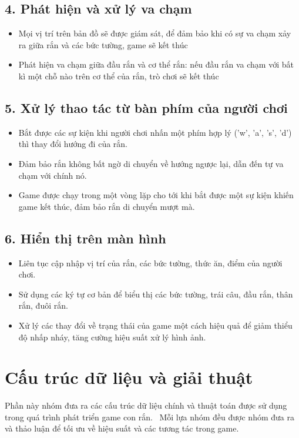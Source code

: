 \documentclass[12pt]{report}
\begin{document}
\subsection*{4. Phát hiện và xử lý va chạm}
\begin{itemize}
    \item Mọi vị trí trên bản đồ sẽ được giám sát, để đảm bảo khi có sự va chạm xảy ra giữa rắn và các bức tường, game sẽ kết thúc
    \item Phát hiện va chạm giữa đầu rắn và cơ thể rắn: nếu đầu rắn va chạm với bất kì một chỗ nào trên cơ thể của rắn, trò chơi sẽ kết thúc
\end{itemize}

\subsection*{5. Xử lý thao tác từ bàn phím của người chơi}
\begin{itemize}
    \item Bắt được các sự kiện khi người chơi nhấn một phím hợp lý ('w', 'a', 's', 'd') thì thay đổi hướng đi của rắn.
    \item Đảm bảo rắn không bất ngờ di chuyển về hướng ngược lại, dẫn đến tự va chạm với chính nó.
    \item Game được chạy trong một vòng lặp cho tới khi bắt được một sự kiện khiến game kết thúc, đảm bảo rắn di chuyển mượt mà.
\end{itemize}

\subsection*{6. Hiển thị trên màn hình}
\begin{itemize}
    \item Liên tục cập nhập vị trí của rắn, các bức tường, thức ăn, điểm của người chơi.
    \item Sử dụng các ký tự cơ bản để biểu thị các bức tường, trái câu, đầu rắn, thân rắn, đuôi rắn.
    \item Xử lý các thay đổi về trạng thái của game một cách hiệu quả để giảm thiểu độ nhấp nháy, tăng cường hiệu suất xử lý hình ảnh.
\end{itemize}


\section*{Cấu trúc dữ liệu và giải thuật}
Phần này nhóm đưa ra các cấu trúc dữ liệu chính và thuật toán được sử dụng trong quá trình phát triển game con rắn. \
Mỗi lựa nhóm đều được nhóm đưa ra và thảo luận để tối ưu về hiệu suất và các tương tác trong game.
\end{document}
